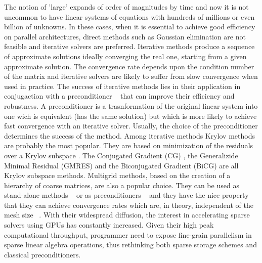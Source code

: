 \documentclass[conference]{IEEEtran}
\begin{document}
The notion of 'large' expands of order of magnitudes by time and now it is not uncommon to have linear systems of equations with hundreds of millions or even billion of unknowns. 
In these cases, when it is essential to achieve good efficiency on parallel architectures, direct methods such as Gaussian elimination are not feasible and iterative solvers are preferred. 
Iterative methods produce a sequence of approximate solutions ideally converging the real one, starting from a given approximate solution. The convergence rate depends upon the condition number of the matrix and iterative solvers are likely to suffer from slow convergence when used in practice. The success of iterative methods lies in their application in conjugaction with a preconditioner ~\cite{barrett1994templates} that can improve their efficiency and robustness.
A preconditioner is a trasnformation of the original linear system into one wich is equivalent (has the same solution) but which is more likely to achieve fast convergence with an iterative solver. Usually, the choice of the preconditioner determines the success of the method.
Among iterative methods Krylov methods are probably the most popular. They are based on minimization of the residuals over a Krylov subspace \cite{ipsen1998idea}. The Conjugated Gradient (CG) \cite{shewchuk1994introduction}, the Generalizide Minimal Residual (GMRES) \cite{saad1986gmres} and the Biconjugated Gradient (BiCG) \cite{van1992bi} are all Krylov subspace methods. Multigrid methods, based on the creation of a hierarchy of coarse matrices, are also a popular choice. They can be used as stand-alone methods ~\cite{brandt1977multi} or as preconditioners ~\cite{bramble1990parallel} and they have the nice property that they can achieve convergence rates which are, in theory, independent of the mesh size ~\cite{saad2003iterative}. With their widespread diffusion, the interest in accelerating sparse solvers using GPUs has constantly increased. Given their high peak computational throughput, programmer need to expose fine-grain parallelism in sparse linear algebra operations, thus rethinking both sparse storage schemes and classical preconditioners.
\end{document}
